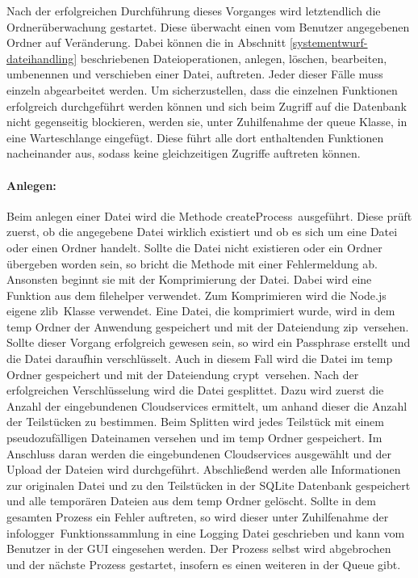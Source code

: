 Nach der erfolgreichen Durchführung dieses Vorganges wird letztendlich die Ordnerüberwachung gestartet.
Diese überwacht einen vom Benutzer angegebenen Ordner auf Veränderung.
Dabei können die in Abschnitt \ref{systementwurf-dateihandling} beschriebenen Dateioperationen, anlegen, löschen, bearbeiten, umbenennen und verschieben einer Datei, auftreten.
Jeder dieser Fälle muss einzeln abgearbeitet werden.
Um sicherzustellen, dass die einzelnen Funktionen erfolgreich durchgeführt werden können und sich beim Zugriff auf die Datenbank nicht gegenseitig blockieren, werden sie, unter Zuhilfenahme der queue Klasse, in eine Warteschlange eingefügt.
Diese führt alle dort enthaltenden Funktionen nacheinander aus, sodass keine gleichzeitigen Zugriffe auftreten können.

\paragraph{Anlegen:}Beim anlegen einer Datei wird die Methode \frqq createProcess\flqq\ ausgeführt.
Diese prüft zuerst, ob die angegebene Datei wirklich existiert und ob es sich um eine Datei oder einen Ordner handelt.
Sollte die Datei nicht existieren oder ein Ordner übergeben worden sein, so bricht die Methode mit einer Fehlermeldung ab.
Ansonsten beginnt sie mit der Komprimierung der Datei.
Dabei wird eine Funktion aus dem filehelper verwendet.
Zum Komprimieren wird die Node.js eigene \frqq zlib\flqq\ Klasse verwendet.
Eine Datei, die komprimiert wurde, wird in dem temp Ordner der Anwendung gespeichert und mit der Dateiendung \frqq zip\flqq\ versehen.
Sollte dieser Vorgang erfolgreich gewesen sein, so wird ein Passphrase erstellt und die Datei daraufhin verschlüsselt.
Auch in diesem Fall wird die Datei im temp Ordner gespeichert und mit der Dateiendung \frqq crypt\flqq\ versehen.
Nach der erfolgreichen Verschlüsselung wird die Datei gesplittet.
Dazu wird zuerst die Anzahl der eingebundenen Cloudservices ermittelt, um anhand dieser die Anzahl der Teilstücken zu bestimmen.
Beim Splitten wird jedes Teilstück mit einem pseudozufälligen Dateinamen versehen und im temp Ordner gespeichert.
Im Anschluss daran werden die eingebundenen Cloudservices ausgewählt und der Upload der Dateien wird durchgeführt.
Abschließend werden alle Informationen zur originalen Datei und zu den Teilstücken in der SQLite Datenbank gespeichert und alle temporären Dateien aus dem temp Ordner gelöscht.
Sollte in dem gesamten Prozess ein Fehler auftreten, so wird dieser unter Zuhilfenahme der \frqq infologger\flqq\ Funktionssammlung in eine Logging Datei geschrieben und kann vom Benutzer in der \ac{GUI} eingesehen werden.
Der Prozess selbst wird abgebrochen und der nächste Prozess gestartet, insofern es einen weiteren in der Queue gibt.

